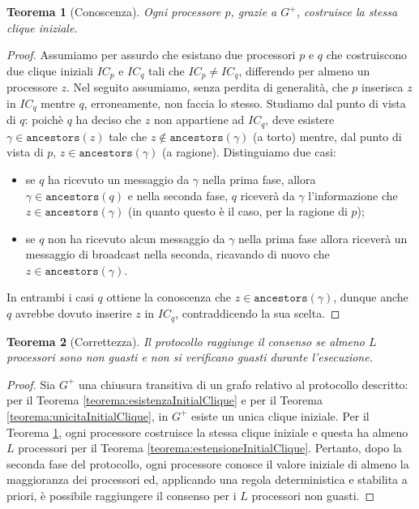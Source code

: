 \documentclass{article}
\newtheorem{teorema}{Teorema}
\begin{document}
\begin{teorema}[Conoscenza]
\label{teorema:conoscenzaInitialClique}
  Ogni processore $p$, grazie a $G^+$, costruisce la stessa clique
  iniziale.
\end{teorema}
\begin{proof}
  Assumiamo per assurdo che esistano due processori $p$ e $q$ che
  costruiscono due clique iniziali $IC_p$ e $IC_q$ tali che $IC_p\neq
  IC_q$, differendo per almeno un processore $z$. Nel seguito
  assumiamo, senza perdita di generalità, che $p$ inserisca $z$ in
  $IC_q$ mentre $q$, erroneamente, non faccia lo stesso. Studiamo dal
  punto di vista di $q$: poichè $q$ ha deciso che $z$ non appartiene
  ad $IC_q$, deve esistere $\gamma \in \texttt{ancestors}(z)$ tale che
  $z \not \in \texttt{ancestors}(\gamma)$ (a torto) mentre, dal punto
  di vista di $p$, $z \in \texttt{ancestors}(\gamma)$ (a
  ragione). Distinguiamo due casi:
\begin{itemize}
\item se $q$ ha ricevuto un messaggio da $\gamma$ nella prima fase,
  allora $\gamma \in \texttt{ancestors}(q)$ e nella seconda fase, $q$
  riceverà da $\gamma$ l'informazione che $z \in
  \texttt{ancestors}(\gamma)$ (in quanto questo \`e il caso, per la
  ragione di $p$);
\item se $q$ non ha ricevuto alcun messaggio da $\gamma$ nella prima
  fase allora riceverà un messaggio di broadcast nella seconda,
  ricavando di nuovo che $z \in \texttt{ancestors}(\gamma)$.
\end{itemize} 
In entrambi i casi $q$ ottiene la conoscenza che $z \in
\texttt{ancestors}(\gamma)$, dunque anche $q$ avrebbe dovuto inserire
$z$ in $IC_q$, contraddicendo la sua scelta.
\end{proof}

\begin{teorema}[Correttezza]
  Il protocollo raggiunge il consenso se almeno $L$ processori sono
  non guasti e non si verificano guasti durante
  l'esecuzione.\end{teorema}
\begin{proof}
  Sia $G^+$ una chiusura transitiva di un grafo relativo al protocollo
  descritto: per il Teorema \ref{teorema:esistenzaInitialClique} e per
  il Teorema \ref{teorema:unicitaInitialClique}, in $G^+$ esiste un
  unica clique iniziale. Per il Teorema
  \ref{teorema:conoscenzaInitialClique}, ogni processore costruisce la
  stessa clique iniziale e questa ha almeno $L$ processori per il
  Teorema \ref{teorema:estensioneInitialClique}. Pertanto, dopo la
  seconda fase del protocollo, ogni processore conosce il valore
  iniziale di almeno la maggioranza dei processori ed, applicando una
  regola deterministica e stabilita a priori, \`e possibile
  raggiungere il consenso per i $L$ processori non guasti.
\end{proof}
\end{document}
